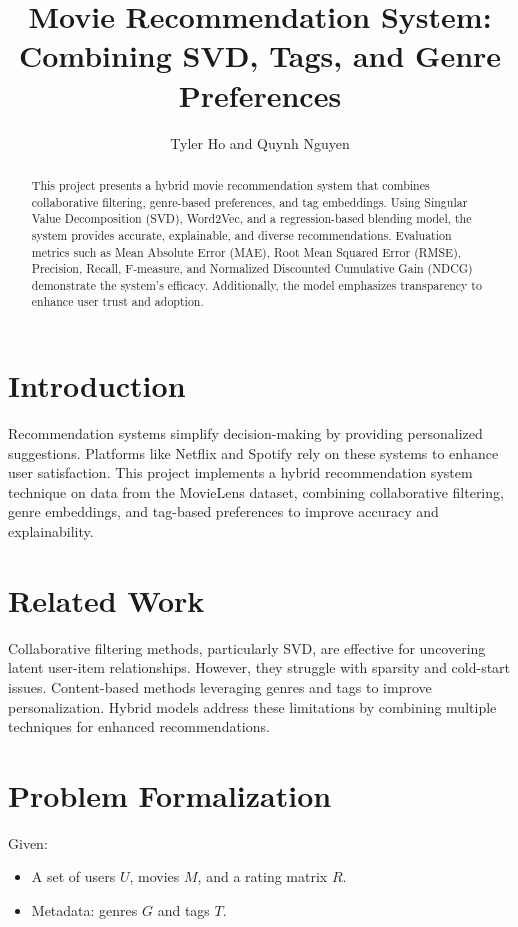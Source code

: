 \documentclass[nonacm, sigconf]{acmart}
\title{Movie Recommendation System: Combining SVD, Tags, and Genre Preferences}
\author{Tyler Ho and Quynh Nguyen}
\affiliation{
  \institution{Rutgers University}
  \city{New Brunswick}
  \state{NJ}
  \country{USA}
}
\begin{document}
\begin{abstract}
This project presents a hybrid movie recommendation system that combines collaborative filtering, genre-based preferences, and tag embeddings. Using Singular Value Decomposition (SVD), Word2Vec, and a regression-based blending model, the system provides accurate, explainable, and diverse recommendations. Evaluation metrics such as Mean Absolute Error (MAE), Root Mean Squared Error (RMSE), Precision, Recall, F-measure, and Normalized Discounted Cumulative Gain (NDCG) demonstrate the system’s efficacy. Additionally, the model emphasizes transparency to enhance user trust and adoption.
\end{abstract}


\maketitle

\section{Introduction}
Recommendation systems simplify decision-making by providing personalized suggestions. Platforms like Netflix and Spotify rely on these systems to enhance user satisfaction. This project implements a hybrid recommendation system technique on data from the MovieLens dataset, combining collaborative filtering, genre embeddings, and tag-based preferences to improve accuracy and explainability.

\section{Related Work}
Collaborative filtering methods, particularly SVD, are effective for uncovering latent user-item relationships. However, they struggle with sparsity and cold-start issues. Content-based methods leveraging genres and tags to improve personalization. Hybrid models address these limitations by combining multiple techniques for enhanced recommendations.

\section{Problem Formalization}
Given:
\begin{itemize}
    \item A set of users $U$, movies $M$, and a rating matrix $R$.
    \item Metadata: genres $G$ and tags $T$.
\end{itemize}
\end{document}
